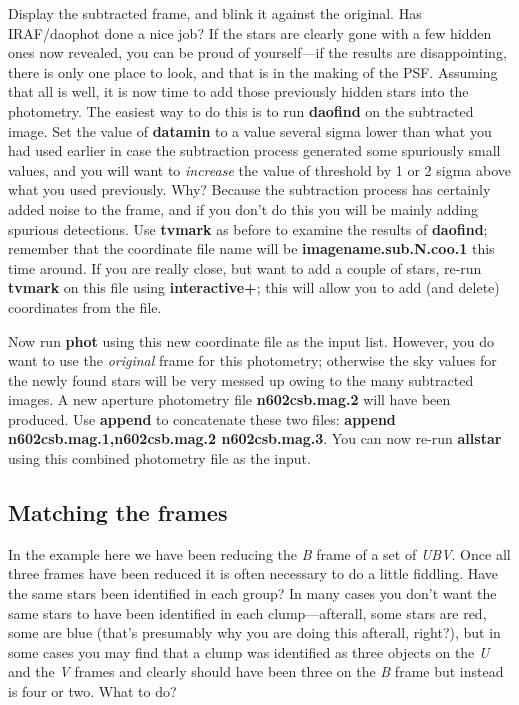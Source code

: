 Display the subtracted frame, and blink it against the original.  Has
IRAF/daophot done a nice job?  If the stars are clearly gone with a few
hidden ones now revealed, you can be proud of yourself---if the results
are disappointing, there is only one place to look, and that is in the
making of the PSF.  Assuming that all is well, it is now time to 
add those previously hidden stars into the photometry.  
The easiest way to do this is to run {\bf daofind} on the subtracted
image. 
Set the value of {\bf datamin} to a value several sigma lower
than what you had used earlier in case the subtraction process generated
some spuriously small values, and you will want to {\it increase} the
value of threshold by 1 or 2 sigma above what you used previously.
Why?  Because the subtraction process has certainly added noise to the
frame, and if you don't do this you will be mainly adding spurious
detections.  Use {\bf tvmark} as before to examine the results of {\bf
daofind}; remember that the coordinate file name will be 
{\bf imagename.sub.N.coo.1} this time around.  If you are really close,
but want to add a couple of stars, re-run {\bf tvmark} on this file
using
{\bf interactive+}; this will allow you to add (and delete) coordinates
from the file.
 
Now run {\bf phot} using this new coordinate file as the input list.
However, you do want to use the {\it original} frame for this photometry;
otherwise the sky values for the newly found stars will be very messed
up owing to the many subtracted images.  A new aperture photometry file
{\bf n602csb.mag.2} will have been produced.  Use {\bf append} to 
concatenate these two files: {\bf append n602csb.mag.1,n602csb.mag.2
n602csb.mag.3}.  You can now re-run {\bf allstar} using this combined
photometry file as the input.
 
\subsection{Matching the frames}
In the example here we have been reducing the {\it B} frame of 
a set of {\it UBV}.  Once all three frames have been reduced it is often
necessary to do a little fiddling. Have the same stars been identified
in each group?  In many cases you don't want the same stars to have been
identified in each clump---afterall, some stars are red, some are blue
(that's presumably why you are doing this afterall, right?), but in some
cases you may find that a clump was identified as three objects on the
{\it U} and the {\it V} frames and clearly should have been three on the
{\it B} frame but instead is four or two. What to do?
 
